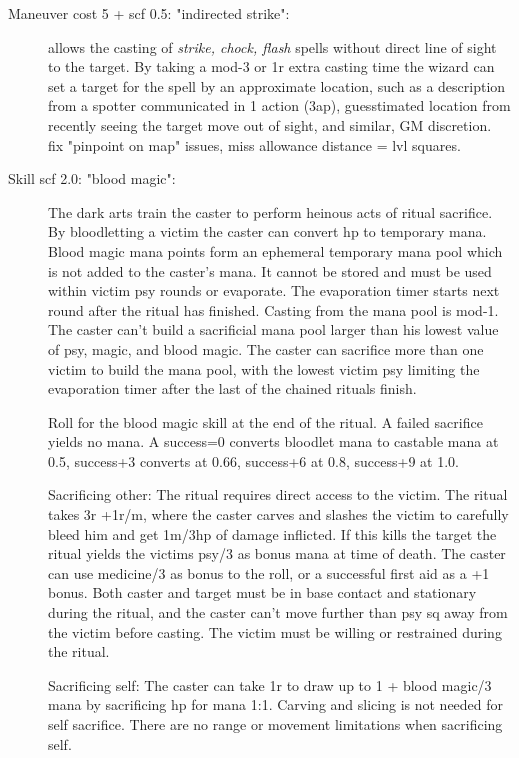 \begin{description}
\item[Maneuver cost 5 + scf 0.5: "indirected strike":] allows the casting of \emph{strike, chock, flash} spells without direct line of sight to the target. By taking a mod-3 or 1r extra casting time the wizard can set a target for the spell by an approximate location, such as a description from a spotter communicated in 1 action (3ap), guesstimated location from recently seeing the target move out of sight, and similar, GM discretion.
\\ \todo fix "pinpoint on map" issues, miss allowance distance = lvl squares.


\item[Skill scf 2.0: "blood magic":] The dark arts train the caster to perform heinous acts of ritual sacrifice. By bloodletting a victim the caster can convert hp to temporary mana. Blood magic mana points form an ephemeral temporary mana pool which is not added to the caster's mana. It cannot be stored and must be used within victim psy rounds or evaporate. The evaporation timer starts next round after the ritual has finished. Casting from the mana pool is mod-1.
The caster can't build a sacrificial mana pool larger than his lowest value of psy, magic, and blood magic. The caster can sacrifice more than one victim to build the mana pool, with the lowest victim psy limiting the evaporation timer after the last of the chained rituals finish.

Roll for the blood magic skill at the end of the ritual. A failed sacrifice yields no mana. A success=0 converts bloodlet mana to castable mana at 0.5, success+3 converts at 0.66, success+6 at 0.8, success+9 at 1.0.

Sacrificing other: The ritual requires direct access to the victim. The ritual takes 3r +1r/m, where the caster carves and slashes the victim to carefully bleed him and get 1m/3hp of damage inflicted. If this kills the target the ritual yields the victims psy/3 as bonus mana at time of death.
The caster can use medicine/3 as bonus to the roll, or a successful first aid as a +1 bonus.
Both caster and target must be in base contact and stationary during the ritual, and the caster can't move further than psy sq away from the victim before casting. The victim must be willing or restrained during the ritual.

Sacrificing self: The caster can take 1r to draw up to 1 + blood magic/3 mana by sacrificing hp for mana 1:1. Carving and slicing is not needed for self sacrifice. There are no range or movement limitations when sacrificing self.


\end{description}
